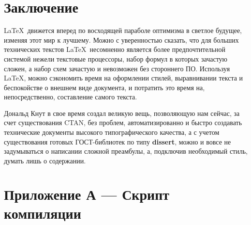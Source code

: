 \clearpage
\section*{Заключение}

\LaTeX~движется вперед по восходящей параболе оптимизма в светлое будущее, изменяя этот мир к лучшему. Можно с уверенностью сказать, что для больших технических текстов \LaTeX~несомненно является более предпочтительной системой нежели текстовые процессоры, набор формул в которых зачастую сложен, а набор схем зачастую и невозможен без стороннего ПО. Используя \LaTeX, можно сэкономить время на оформлении стилей, выравнивании текста и беспокойстве о внешнем виде документа, и потратить это время на, непосредственно, составление самого текста.

Дональд Кнут в свое время создал великую вещь, позволяющую нам сейчас, за счет существования CTAN, без проблем, автоматизированно и быстро создавать технические документы высокого типографического качества, а с учетом существования готовых ГОСТ-библиотек по типу \textbf{dissert}, можно и вовсе не задумываться о написании сложной преамбулы, а, подключив необходимый стиль, думать лишь о содержании.

\section*{Приложение А --- Скрипт компиляции}

\inputminted[breaklines,fontsize=\small]{bash}{/home/ewancoder/bin/pl}

\clearpage

